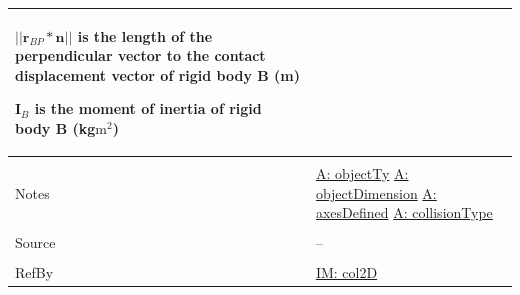 \documentclass[12pt]{article}
\begin{document}
\begin{minipage}{\textwidth}
\begin{tabular}{>{\raggedright}p{}>{\raggedright\arraybackslash}p{}}
\begin{symbDescription}
                        \item{$||{\mathbf{r}_{BP}}*\mathbf{n}||$ is the length of the perpendicular vector to the contact displacement vector of rigid body B (m)}
                        \item{${\mathbf{I}_{B}}$ is the moment of inertia of rigid body B (kg$\text{m}^{2}$)}
                        \end{symbDescription}
          \\ \midrule \\
          Notes & \hyperref[assumpOT]{A: objectTy}
                  \hyperref[assumpOD]{A: objectDimension}
                  \hyperref[assumpAD]{A: axesDefined}
                  \hyperref[assumpCT]{A: collisionType}
          \\ \midrule \\
          Source & --
          \\ \midrule \\
          RefBy & \hyperref[IM:col2D]{IM: col2D}
          \\ \bottomrule
          \end{tabular}
          \end{minipage}
\par~
\end{document}
